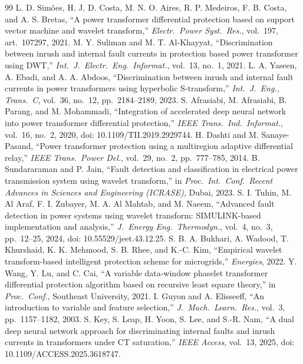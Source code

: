 \documentclass[12pt,a4paper,oneside]{report}
\begin{document}
\begin{thebibliography}{99}
 L. D. Sim\~oes, H. J. D. Costa, M. N. O. Aires, R. P. Medeiros, F. B. Costa, and A. S. Bretas, ``A power transformer differential protection based on support vector machine and wavelet transform,'' \textit{Electr.\ Power Syst.\ Res.}, vol.~197, art.\ 107297, 2021.
 M. Y. Suliman and M. T. Al-Khayyat, ``Discrimination between inrush and internal fault currents in protection based power transformer using DWT,'' \textit{Int.\ J.\ Electr.\ Eng.\ Informat.}, vol.~13, no.~1, 2021.
 L. A. Yaseen, A. Ebadi, and A. A. Abdoos, ``Discrimination between inrush and internal fault currents in power transformers using hyperbolic S-transform,'' \textit{Int.\ J.\ Eng., Trans.\ C}, vol.~36, no.~12, pp.~2184--2189, 2023.
 S. Afrasiabi, M. Afrasiabi, B. Parang, and M. Mohammadi, ``Integration of accelerated deep neural network into power transformer differential protection,'' \textit{IEEE Trans.\ Ind.\ Informat.}, vol.~16, no.~2, 2020, doi: 10.1109/TII.2019.2929744.
 H. Dashti and M. Sanaye-Pasand, ``Power transformer protection using a multiregion adaptive differential relay,'' \textit{IEEE Trans.\ Power Del.}, vol.~29, no.~2, pp.~777--785, 2014.
 B. Sundararaman and P. Jain, ``Fault detection and classification in electrical power transmission system using wavelet transform,'' in \textit{Proc.\ Int.\ Conf.\ Recent Advances in Sciences and Engineering (ICRASE)}, Dubai, 2023.
 S. I. Tuhin, M. Al Araf, F. I. Zubayer, M. A. Al Mahtab, and M. Naeem, ``Advanced fault detection in power systems using wavelet transform: SIMULINK-based implementation and analysis,'' \textit{J.\ Energy Eng.\ Thermodyn.}, vol.~4, no.~3, pp.~12--25, 2024, doi: 10.55529/jeet.43.12.25.
 S. B. A. Bukhari, A. Wadood, T. Khurshaid, K. K. Mehmood, S. B. Rhee, and K.-C. Kim, ``Empirical wavelet transform-based intelligent protection scheme for microgrids,'' \textit{Energies}, 2022.
 Y. Wang, Y. Lu, and C. Cai, ``A variable data-window phaselet transformer differential protection algorithm based on recursive least square theory,'' in \textit{Proc.\ Conf.}, Southeast University, 2021.
 I. Guyon and A. Elisseeff, ``An introduction to variable and feature selection,'' \textit{J.\ Mach.\ Learn.\ Res.}, vol.~3, pp.~1157--1182, 2003.
 S. Key, S. Leap, H. Yoon, S. Lee, and S.-R. Nam, ``A dual deep neural network approach for discriminating internal faults and inrush currents in transformers under CT saturation,'' \textit{IEEE Access}, vol.~13, 2025, doi: 10.1109/ACCESS.2025.3618747.

\end{thebibliography}
\end{document}
